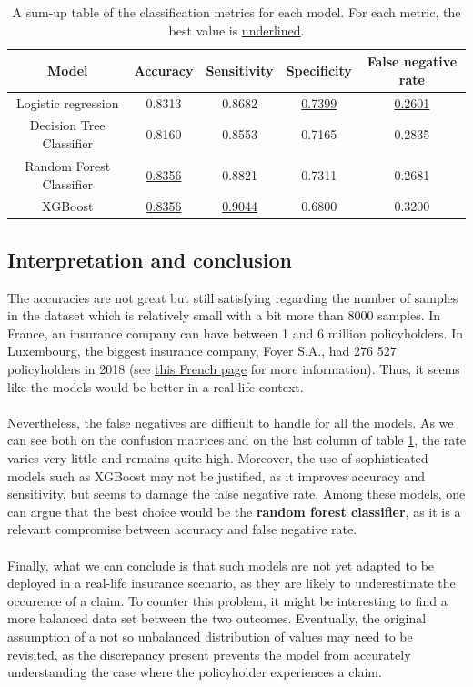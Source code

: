 \documentclass[a4paper,11pt, titlepage]{article}
\begin{document}
\begin{table}[h!]
    \begin{tabular}[t]{|c|cccc|}
        \rowcolor{orange!30}
\hline
\textbf{Model} & \textbf{Accuracy} & \textbf{Sensitivity} & \textbf{Specificity} & \textbf{False negative rate} \\
\hline
Logistic regression         & 0.8313             & 0.8682             & \underline{0.7399} & \underline{0.2601} \\
Decision Tree Classifier    & 0.8160             & 0.8553             & 0.7165             & 0.2835 \\
Random Forest Classifier    & \underline{0.8356} & 0.8821             & 0.7311             & 0.2681 \\
XGBoost                     & \underline{0.8356}             & \underline{0.9044} & 0.6800             & 0.3200 \\
\hline
    \end{tabular}
\centering
\caption{A sum-up table of the classification metrics for each model. For each metric, the best value is \underline{underlined}.}
\label{metrics}
\end{table}%

\subsection{Interpretation and conclusion}

The accuracies are not great but still satisfying regarding the number of samples in the dataset which is relatively small with a bit more than 8000 samples. In France, an insurance company can have between 1 and 6 million policyholders. In Luxembourg, the biggest insurance company, Foyer S.A., had 276 527 policyholders in 2018 (see \href{https://fr.wikipedia.org/wiki/Liste_de_groupes_d%27assurance}{this French page} for more information). Thus, it seems like the models would be better in a real-life context.\\
\\
\noindent Nevertheless, the false negatives are difficult to handle for all the models. As we can see both on the confusion matrices and on the last column of table \ref{metrics}, the rate varies very little and remains quite high. Moreover, the use of sophisticated models such as XGBoost may not be justified, as it improves accuracy and sensitivity, but seems to damage the false negative rate. Among these models, one can argue that the best choice would be the \textbf{random forest classifier}, as it is a relevant compromise between accuracy and false negative rate. \\
\\
\noindent Finally, what we can conclude is that such models are not yet adapted to be deployed in a real-life insurance scenario, as they are likely to underestimate the occurence of a claim. To counter this problem, it might be interesting to find a more balanced data set between the two outcomes. Eventually, the original assumption of a not so unbalanced distribution of values may need to be revisited, as the discrepancy present prevents the model from accurately understanding the case where the policyholder experiences a claim.  
\end{document}
